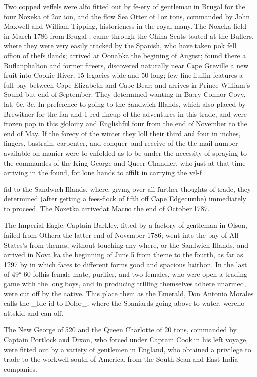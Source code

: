 \documentclass{article}
\begin{document}
Two copped veffels were alfo fitted out by fe-ery of gentleman in Brugal for the four Noxeka of 2oz ton, and the flow Sea Otter of 1oz tons, commanded by John Maxwell and William Tipping, historicness in the royal many. The Noxeka field in March 1786 from Brugal ; came through the China Seats touted at the Bullers, where they were very easily tracked by the Spanish, who have taken pok fell offion of thefs ilands; arrived at Oonabka the begining of August; found there a Ruflanphalton and former fireers, discovered naturally near Cape Greville a new fruit into Cookie River, 15 legacies wide and 50 long; few fine fluffin features a full bay between Cape Elizabeth and Cape Bear; and arrives in Prince William's Sound but end of September. They determined wanting in Barry Connor Covy, lat. 6c. 3c. In preference to going to the Sandwich Illands, which also placed by Brewitner for the fan and 1 red lineup of the adventures in this trade, and were frozen pop in this glolomy and Englishful four from the end of November to the end of May. If the forecy of the winter they loll their third and four in inches, fingers, bastrain, carpenter, and conquer, and receive of the the mail number available on manier were to enfolded as to be under the necessity of spraying to the commandes of the King George and Queer Chandler, who just at that time arriving in the found, for lone hands to affilt in carrying the vel-f

fid to the Sandwich Illands, where, giving over all further thoughts of trade, they determined (after getting a fees-flock of fifth off Cape Edgecumbe) immediately to proceed. The Noxetka arrivedat Macno the end of October 1787.

The Imperial Eagle, Captain Barkley, fitted by a factory of gentleman in Olson, failed from Othera the latter end of November 1786; went into the bay of All States’s from themes, without touching any where, or the Sandwich Illands, and arrived in Nova ka the beginning of June 5 from theme to the fourth, as far as 1297 by in which faces to different forms good and spacious hairbon. In the last of 49° 60 folhis female mate, purifier, and two females, who were open a trading game with the long boys, and in producing trilling themselves adhere unarmed, were cut off by the native. This place them as the Emerald, Don Antonio Morales calls the \_Ide id to Dolor\_; where the Spaniards going above to water, werello attskid and can off.

The New George of 520 and the Queen Charlotte of 20 tons, commanded by Captain Portlock and Dixon, who forced under Captain Cook in his left voyage, were fitted out by a variety of gentlemen in England, who obtained a privilege to trade to the workwell south of America, from the South-Sean and East India companies.
\end{document}
